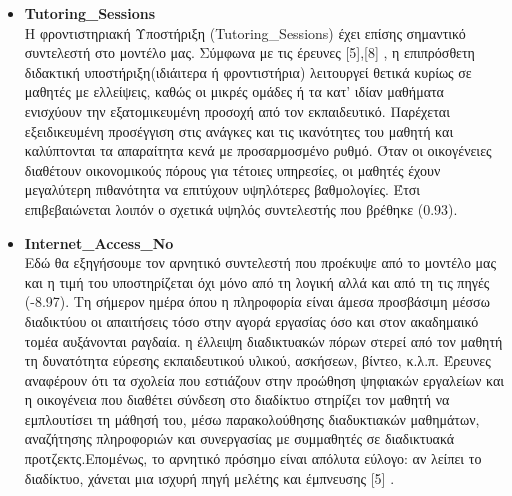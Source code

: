 \documentclass[12pt]{article}
\begin{document}
\begin{itemize}
\item \textbf{Tutoring\_{Sessions}}\\
Η φροντιστηριακή Υποστήριξη (Tutoring\_{Sessions}) έχει επίσης σημαντικό συντελεστή στο μοντέλο μας. Σύμφωνα με τις έρευνες [5],[8] , η επιπρόσθετη διδακτική υποστήριξη(ιδιάιτερα ή φροντιστήρια) 
λειτουργεί θετικά κυρίως σε μαθητές με ελλείψεις, καθώς οι μικρές ομάδες ή τα κατ’ ιδίαν μαθήματα ενισχύουν την εξατομικευμένη προσοχή από τον εκπαιδευτικό. Παρέχεται εξειδικευμένη προσέγγιση 
στις ανάγκες και τις ικανότητες του μαθητή και καλύπτονται τα απαραίτητα κενά με προσαρμοσμένο ρυθμό.  Όταν οι οικογένειες διαθέτουν οικονομικούς πόρους για τέτοιες υπηρεσίες, οι μαθητές έχουν 
μεγαλύτερη πιθανότητα να επιτύχουν υψηλότερες βαθμολογίες. Έτσι επιβεβαιώνεται λοιπόν ο σχετικά υψηλός συντελεστής που βρέθηκε (0.93).

\item \textbf{Internet\_{Access}\_{No}}\\
Εδώ θα εξηγήσουμε τον αρνητικό συντελεστή που προέκυψε από το μοντέλο μας και η τιμή του υποστηρίζεται όχι μόνο από τη λογική αλλά και από τη τις πηγές (-8.97). Τη σήμερον ημέρα όπου η πληροφορία
είναι άμεσα προσβάσιμη μέσσω διαδικτύου οι απαιτήσεις τόσο στην αγορά εργασίας όσο και στον ακαδημαικό τομέα αυξάνονται ραγδαία. η έλλειψη διαδικτυακών πόρων στερεί από τον μαθητή τη δυνατότητα 
εύρεσης εκπαιδευτικού υλικού, ασκήσεων, βίντεο, κ.λ.π. Έρευνες αναφέρουν ότι  τα σχολεία που εστιάζουν στην προώθηση ψηφιακών εργαλείων και η οικογένεια που διαθέτει σύνδεση στο διαδίκτυο στηρίζει 
τον μαθητή να εμπλουτίσει τη μάθησή του, μέσω παρακολούθησης διαδυκτιακών μαθημάτων, αναζήτησης πληροφοριών και συνεργασίας με συμμαθητές σε διαδικτυακά προτζεκτς.Επομένως, το αρνητικό πρόσημο είναι 
απόλυτα εύλογο: αν λείπει το διαδίκτυο, χάνεται μια ισχυρή πηγή μελέτης και έμπνευσης [5] .


\end{itemize}
\end{document}
